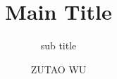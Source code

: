 \title{Main Title}

\subtitle{sub title}

\author{ZUTAO WU}

\makeatletter
\def\@maketitle{
    \raggedright
    \begin{center}
        {\Huge\@title }\\[4ex]
        {\LARGE\@subtitle }\\[8ex]
        \vfill
        \texttt{[image: Figs/QUT\_LOGO]}\\[8ex]
        \vfill
        {\LARGE\@author}\\[4ex]
        {\large\@dept}\\[4ex]
        {\large\@college}\\[8ex]
        \vfill
        {\large\@date}\\[8ex]
    \end{center}}
\makeatother
